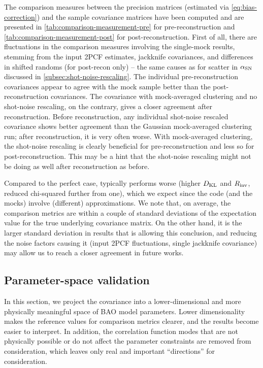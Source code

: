 The comparison measures between the \rascalc{} precision matrices (estimated via \cref{eq:bias-correction}) and the sample covariance matrices have been computed and are presented in \cref{tab:comparison-measurement-pre} for pre-reconstruction and \cref{tab:comparison-measurement-post} for post-reconstruction.
First of all, there are fluctuations in the comparison measures involving the single-mock results, stemming from the input 2PCF estimates, jackknife covariances, and differences in shifted randoms (for post-recon only) -- the same causes as for scatter in $\alpha_{\rm SN}$ discussed in \cref{subsec:shot-noise-rescaling}.
The individual pre-reconstruction covariances appear to agree with the mock sample better than the post-reconstruction covariances.
The covariance with mock-averaged clustering and no shot-noise rescaling, on the contrary, gives a closer agreement after reconstruction.
Before reconstruction, any individual shot-noise rescaled covariance shows better agreement than the Gaussian mock-averaged clustering run; after reconstruction, it is very often worse.
With mock-averaged clustering, the shot-noise rescaling is clearly beneficial for pre-reconstruction and less so for post-reconstruction.
This may be a hint that the shot-noise rescaling might not be doing as well after reconstruction as before.

Compared to the perfect case, \rascalc{} typically performs worse (higher $D_{\rm KL}$ and $R_{\rm inv}$, reduced chi-squared further from one), which we expect since the code (and the mocks) involve (different) approximations.
We note that, on average, the comparison metrics are within a couple of standard deviations of the expectation value for the true underlying covariance matrix.
On the other hand, it is the larger standard deviation in \rascalc{} results that is allowing this conclusion, and reducing the noise factors causing it (input 2PCF fluctuations, single jackknife covariance) may allow us to reach a closer agreement in future works.

\subsection{Parameter-space validation}
\label{subsec:parameter-space-validation}

In this section, we project the covariance into a lower-dimensional and more physically meaningful space of BAO model parameters.
Lower dimensionality makes the reference values for comparison metrics clearer, and the results become easier to interpret.
In addition, the correlation function modes that are not physically possible or do not affect the parameter constraints are removed from consideration, which leaves only real and important ``directions'' for consideration.

